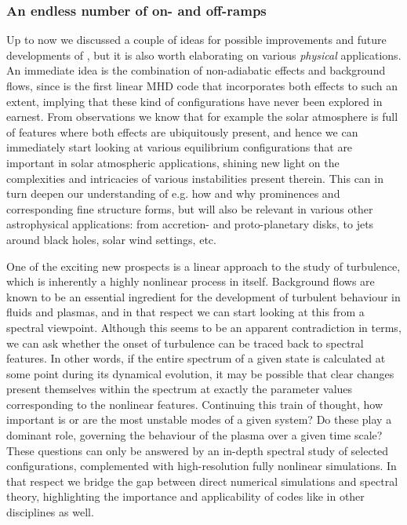 \subsubsection{An endless number of on- and off-ramps}
Up to now we discussed a couple of ideas for possible improvements and future developments of {\legolas}, but it is also worth elaborating on various \emph{physical} applications. An immediate idea is the combination of non-adiabatic effects and background flows, since {\legolas} is the first linear MHD code that incorporates both effects to such an extent, implying that these kind of configurations have never been explored in earnest. From observations we know that for example the solar atmosphere is full of features where both effects are ubiquitously present, and hence we can immediately start looking at various equilibrium configurations that are important in solar atmospheric applications, shining new light on the complexities and intricacies of various instabilities present therein. This can in turn deepen our understanding of e.g. how and why prominences and corresponding fine structure forms, but will also be relevant in various other astrophysical applications: from accretion- and proto-planetary disks, to jets around black holes, solar wind settings, etc.

One of the exciting new prospects is a linear approach to the study of turbulence, which is inherently a highly nonlinear process in itself. Background flows are known to be an essential ingredient for the development of turbulent behaviour in fluids and plasmas, and in that respect we can start looking at this from a spectral viewpoint. Although this seems to be an apparent contradiction in terms, we can ask whether the onset of turbulence can be traced back to spectral features. In other words, if the entire spectrum of a given state is calculated at some point during its dynamical evolution, it may be possible that clear changes present themselves within the spectrum at exactly the parameter values corresponding to the nonlinear features. Continuing this train of thought, how important is or are the most unstable modes of a given system? Do these play a dominant role, governing the behaviour of the plasma over a given time scale? These questions can only be answered by an in-depth spectral study of selected configurations, complemented with high-resolution fully nonlinear simulations. In that respect we bridge the gap between direct numerical simulations and spectral theory, highlighting the importance and applicability of codes like {\legolas} in other disciplines as well.


